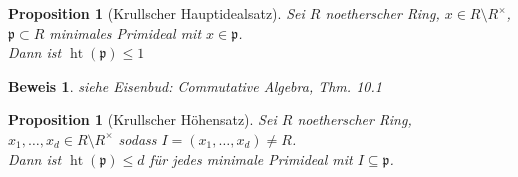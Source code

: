 \documentclass[a4paper,12pt]{report}
\theoremstyle{break}
\newtheorem{Prop}[Def]{Proposition}
\theoremstyle{nonumberbreak}
\newtheorem{Bew}{Beweis}
\theoremstyle{nonumberplain}
\DeclareMathOperator{\Ht}{ht}
\newcommand{\frakp}{\mathfrak{p}}
\begin{document}
\begin{Prop}[Krullscher Hauptidealsatz]\label{prop18.11}
Sei $R$ noetherscher Ring, $x\in R\setminus R^{\times}$, $\mathfrak p\subset R$ minimales Primideal mit $x\in \mathfrak p$.\\
Dann ist $\Ht(\frakp)\le1$
\end{Prop}

\begin{Bew}
siehe Eisenbud: Commutative Algebra, Thm. 10.1
\end{Bew}

\begin{Prop}[Krullscher H\"ohensatz]
Sei $R$ noetherscher Ring, $x_1,\ldots ,x_d\in R\setminus R^{\times}$ sodass $I=(x_1,\ldots ,x_d)\ne R$.\\
Dann ist $\Ht(\frakp)\le d$ f\"ur jedes minimale Primideal mit $I\subseteq \frakp$.
\end{Prop}
\end{document}

